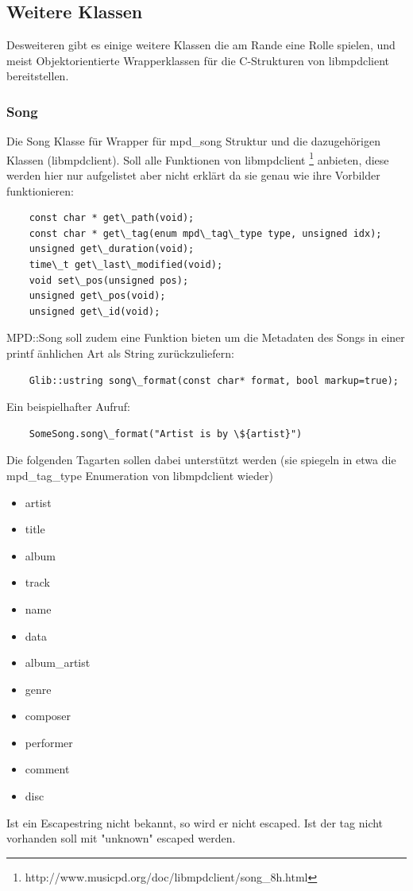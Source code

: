 \subsection{Weitere Klassen}
Desweiteren gibt es einige weitere Klassen die am Rande eine Rolle spielen,
und meist Objektorientierte Wrapperklassen für die C-Strukturen von libmpdclient bereitstellen.

\subsubsection{Song}

Die Song Klasse für Wrapper für mpd\_song Struktur und die dazugehörigen Klassen (libmpdclient).
Soll alle Funktionen von libmpdclient \footnote{http://www.musicpd.org/doc/libmpdclient/song\_8h.html} anbieten,
diese werden hier nur aufgelistet aber nicht erklärt da sie genau wie ihre Vorbilder funktionieren:

\begin{verbatim}
    const char * get\_path(void);
    const char * get\_tag(enum mpd\_tag\_type type, unsigned idx);
    unsigned get\_duration(void);
    time\_t get\_last\_modified(void);
    void set\_pos(unsigned pos);
    unsigned get\_pos(void);
    unsigned get\_id(void);
\end{verbatim}


MPD::Song soll zudem eine Funktion bieten um die Metadaten des Songs in einer printf änhlichen Art als String zurückzuliefern:
\begin{verbatim}
    Glib::ustring song\_format(const char* format, bool markup=true);
\end{verbatim}

Ein beispielhafter Aufruf:
\begin{verbatim}
    SomeSong.song\_format("Artist is by \${artist}") 
\end{verbatim}

Die folgenden Tagarten sollen dabei unterstützt werden (sie spiegeln in etwa die mpd\_tag\_type Enumeration von libmpdclient wieder)
\begin{itemize}
    \item artist
    \item title
    \item album
    \item track
    \item name
    \item data
    \item album\_artist
    \item genre
    \item composer
    \item performer
    \item comment
    \item disc
\end{itemize}
Ist ein Escapestring nicht bekannt, so wird er nicht escaped. Ist der tag nicht vorhanden soll mit "unknown" escaped werden.


